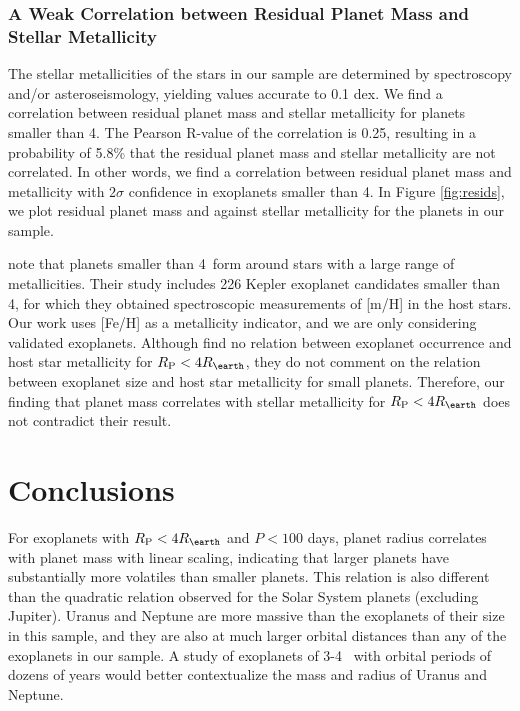 \documentclass[iop]{emulateapj}
\newcommand{\rspecial}{4 \rearth}
\begin{document}
\subsubsection{A Weak Correlation between Residual Planet Mass and Stellar Metallicity}
The stellar metallicities of the stars in our sample are determined by spectroscopy and/or asteroseismology, yielding values accurate to 0.1 dex.  We find a correlation between residual planet mass and stellar metallicity for planets smaller than 4\rearth.  The Pearson R-value of the correlation is 0.25, resulting in a probability of 5.8\% that the residual planet mass and stellar metallicity are not correlated.  In other words, we find a correlation between residual planet mass and metallicity with $2\sigma$ confidence in exoplanets smaller than 4\rearth.  In Figure \ref{fig:resids}, we plot residual planet mass and against stellar metallicity for the planets in our sample.

\citet{Buchhave2012} note that planets smaller than 4\rearth\ form around stars with a large range of metallicities.  Their study includes 226 Kepler exoplanet candidates smaller than 4\rearth, for which they obtained spectroscopic measurements of [m/H] in the host stars.  Our work uses [Fe/H] as a metallicity indicator, and we are only considering validated exoplanets.  Although \citet{Buchhave2012} find no relation between exoplanet occurrence and host star metallicity for $\rpl < 4\rearth$, they do not comment on the relation between exoplanet size and host star metallicity for small planets.  Therefore, our finding that planet mass correlates with stellar metallicity for $\rpl < 4\rearth$ does not contradict their result.


\section{Conclusions}
For exoplanets with $\rpl < \rspecial$ and $P < 100$ days, planet radius correlates with planet mass with linear scaling, indicating that larger planets have substantially more volatiles than smaller planets.  This relation is also different than the quadratic relation observed for the Solar System planets (excluding Jupiter).  Uranus and Neptune are more massive than the exoplanets of their size in this sample, and they are also at much larger orbital distances than any of the exoplanets in our sample.  A study of exoplanets of 3-4 \rearth\ with orbital periods of dozens of years would better contextualize the mass and radius of Uranus and Neptune.
\end{document}
